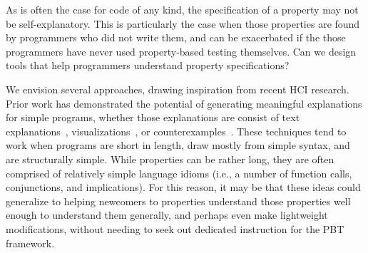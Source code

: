 \iflater
{}
\fi


As is often the case for code of any kind, the specification of a property may 
not be self-explanatory. This is particularly the case when those properties are 
found by programmers who did not write them, and can be exacerbated if the those 
programmers have never used property-based testing themselves. Can we design 
tools that help programmers understand property specifications?

We envision several approaches, drawing inspiration from recent HCI research.  
Prior work has demonstrated the potential of generating meaningful explanations 
for simple programs, whether those explanations are consist of text 
explanations~\cite{ref:head2015tutorons,ref:mayer2015user},
visualizations~\cite{ref:guo2013online}, or 
counterexamples~\cite{ref:dantoni2015can}. These techniques tend to work when 
programs are short in length, draw mostly from simple syntax, and are 
structurally simple.  While properties can be rather long, they are often 
comprised of relatively simple language idioms (i.e., a number of function 
calls, conjunctions, and implications). For this reason, it may be that these 
ideas could generalize to helping newcomers to properties understand those 
properties well enough to understand them generally, and perhaps even make 
lightweight modifications, without needing to seek out dedicated instruction for 
the PBT framework.

